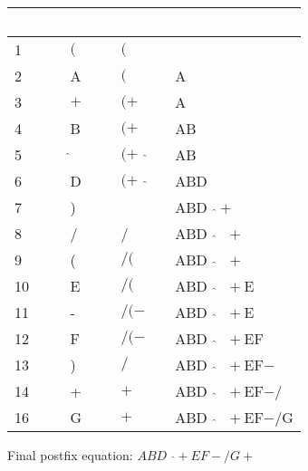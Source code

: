 \begin{center}
\begin{longtable}{|| m{2.8 em} || m{5 em} m{5 em} m{9 em} ||}
	\hline
	\rowcolor{black}
	\textbf{\textcolor{white}{Serial}} & \textbf{\textcolor{white}{Char}} & \textbf{\textcolor{white}{Stack}} & \textbf{\textcolor{white}{Equation}} \\
	\hline\hline\hline\hline
	1 & $($ & $($ &  \\
	2 & A & $($ & A \\
	3 & $+$ & $(+$ & A \\
	4 & B & $(+$ & AB \\
	5 & $\hat{ }$ & $(+\textrm{ }\hat{ }$ & AB \\
	6 & D & $(+\textrm{ }\hat{ }$ & ABD \\
	7 & ) & & ABD$\textrm{ }\hat{ }+$ \\
	8 & / & / & ABD$\textrm{ }\hat{ }\textrm{ }+$ \\
	9 & ( & $/($ & ABD$\textrm{ }\hat{ }\textrm{ }+$ \\
	10 & E & $/($ & ABD$\textrm{ }\hat{ }\textrm{ }+$E \\
	11 & - & $/(-$ & ABD$\textrm{ }\hat{ }\textrm{ }+$E \\
	12 & F & $/(-$ & ABD$\textrm{ }\hat{ }\textrm{ }+$EF \\
	13 & ) & $/$ & ABD$\textrm{ }\hat{ }\textrm{ }+$EF$-$ \\
	14 & + & $+$ & ABD$\textrm{ }\hat{ }\textrm{ }+$EF$-/$ \\
	16 & G & $+$ & ABD$\textrm{ }\hat{ }\textrm{ }+$EF$-/$G \\
\end{longtable}
\end{center}
Final postfix equation: $ABD\textrm{ }\hat{ }+EF-/G+$